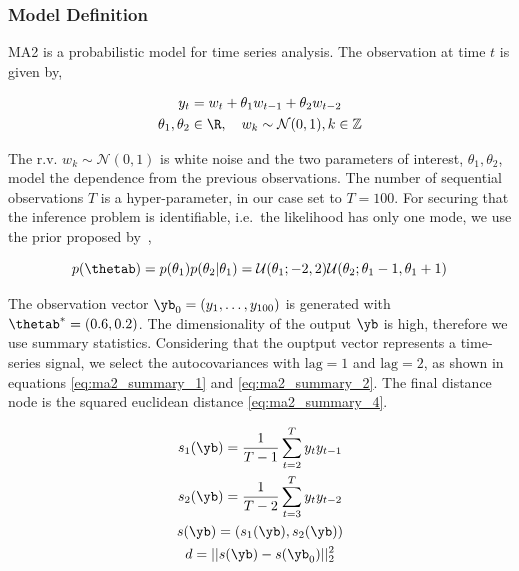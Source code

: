 \subsubsection*{Model Definition}

MA2 is a probabilistic model for time series analysis. The observation
at time \(t\) is given by,

\begin{gather} \label{eq:ma2}
y_t = w_t + \theta_1 w_{t-1} + \theta_2 w_{t-2}\\
\theta_1, \theta_2 \in \R, \quad  w_k \sim \mathcal{N}(0,1), k \in \mathbb{Z}
\end{gather}

\noindent
The r.v. \(w_{k} \sim \mathcal{N}(0,1) \) is white noise and the two
parameters of interest, \(\theta_1, \theta_2\), model the dependence
from the previous observations. The number of sequential observations
\(T\) is a hyper-parameter, in our case set to \(T=100\). For securing
that the inference problem is identifiable, i.e.\ the likelihood has
only one mode, we use the prior proposed by~\cite{Marin2012},

\begin{equation} \label{eq:ma2_prior}
p(\thetab) = p(\theta_1)p(\theta_2|\theta_1)
= \mathcal{U}(\theta_1;-2,2)\mathcal{U}(\theta_2;\theta_1-1, \theta_1+1)
\end{equation}


\noindent
The observation vector \(\yb_0 = (y_1, \ldots, y_{100})\) is generated
with \(\thetab^*=(0.6, 0.2)\). The dimensionality of the output
\(\yb\) is high, therefore we use summary statistics. Considering that
the ouptput vector represents a time-series signal, we select the
autocovariances with \(\mathrm{lag}=1\) and \(\mathrm{lag}=2\), as shown in equations
\eqref{eq:ma2_summary_1} and \eqref{eq:ma2_summary_2}. The final
distance node is the squared euclidean distance
\eqref{eq:ma2_summary_4}.

\begin{gather} \label{eq:ma2_summary_1}
  s_1(\yb) = \frac{1}{T-1} \sum_{t=2}^T y_ty_{t-1}\\ \label{eq:ma2_summary_2}
  s_2(\yb) = \frac{1}{T-2} \sum_{t=3}^T y_ty_{t-2} \\
  s(\yb) = (s_1(\yb), s_2(\yb))\\ \label{eq:ma2_summary_4}
  d = ||s(\yb) - s(\yb_0)||_2^2 
\end{gather}

